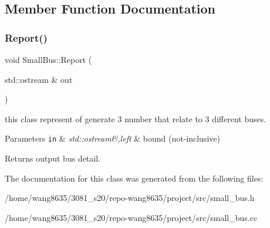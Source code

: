 \subsection{Member Function Documentation}
\mbox{\label{classSmallBus_a989198babc9a180799de58b4f3dadb50}} 
\subsubsection{\texorpdfstring{Report()}{Report()}}
{\footnotesize\ttfamily void Small\+Bus\+::\+Report (\begin{DoxyParamCaption}\item[{std\+::ostream \&}]{out }\end{DoxyParamCaption})}



this class represent of generate 3 number that relate to 3 different buses. 


\begin{DoxyParams}[1]{Parameters}
\mbox{\tt in}  & {\em std\+::ostream\&,left} & bound (not-\/inclusive)\\
\hline
\end{DoxyParams}
\begin{DoxyReturn}{Returns}
output bus detail. 
\end{DoxyReturn}


The documentation for this class was generated from the following files\+:\begin{DoxyCompactItemize}
\item 
/home/wang8635/3081\+\_\+s20/repo-\/wang8635/project/src/small\+\_\+bus.\+h\item 
/home/wang8635/3081\+\_\+s20/repo-\/wang8635/project/src/small\+\_\+bus.\+cc\end{DoxyCompactItemize}
